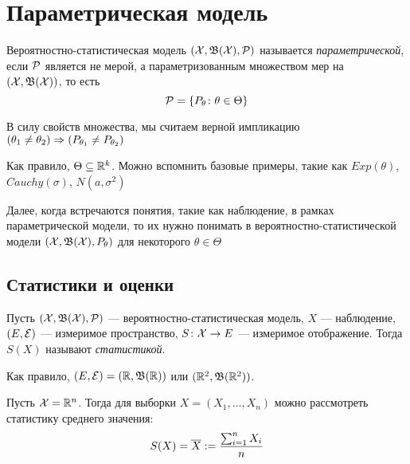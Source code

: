 \section{Параметрическая модель}

\begin{definition}
	Вероятностно-статистическая модель $(\mathcal{X}, \mathfrak{B}(\mathcal{X}), \mathcal{P})$ называется \textit{параметрической}, если $\mathcal{P}$ является не мерой, а параметризованным множеством мер на \\ $(\mathcal{X}, \mathfrak{B}(\mathcal{X}))$, то есть
	\[
		\mathcal{P} = \{P_\theta \colon \theta \in \Theta\}
	\]
\end{definition}

\begin{note}
	В силу свойств множества, мы считаем верной импликацию $(\theta_1 \neq \theta_2) \Rightarrow (P_{\theta_1} \neq P_{\theta_2})$
\end{note}

\begin{note}
	Как правило, $\Theta \subseteq \mathbb{R}^k$. Можно вспомнить базовые примеры, такие как $Exp(\theta)$, $Cauchy(\sigma)$, $N(a, \sigma^2)$
\end{note}

\begin{anote}
	Далее, когда встречаются понятия, такие как наблюдение, в рамках параметрической модели, то их нужно понимать в вероятностно-статистической модели $(\mathcal{X}, \mathfrak{B}(\mathcal{X}), P_\theta)$ для некоторого $\theta \in \Theta$
\end{anote}

\subsection{Статистики и оценки}

\begin{definition}
	Пусть $(\mathcal{X}, \mathfrak{B}(\mathcal{X}), \mathcal{P})$ --- вероятностно-статистическая модель, $X$ --- наблюдение, $(E, \mathcal{E})$ --- измеримое пространство, $S \colon \mathcal{X} \to E$ --- измеримое отображение. Тогда $S(X)$ называют \textit{статистикой}.
\end{definition}

\begin{note}
	Как правило, $(E, \mathcal{E}) = (\mathbb{R}, \mathfrak{B}(\mathbb{R}))$ или $(\mathbb{R}^2, \mathfrak{B}(\mathbb{R}^2))$.
\end{note}

\begin{example}
	Пусть $\mathcal{X} = \mathbb{R}^n$. Тогда для выборки $X = (X_1, \ldots, X_n)$ можно рассмотреть статистику среднего значения:
	\[
		S(X) = \overline{X} := \frac{\sum_{i = 1}^n X_i}{n}
	\]
\end{example}\

